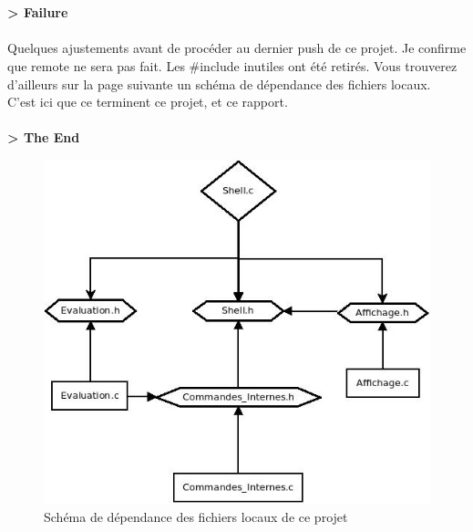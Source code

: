 \\\\
\textbf{> Failure}
\\\\
Quelques ajustements avant de procéder au dernier push de ce projet. Je confirme que remote ne sera pas fait. Les \#include inutiles ont été retirés. Vous trouverez d'ailleurs sur la page suivante un schéma de dépendance des fichiers locaux.
\\C'est ici que ce terminent ce projet, et ce rapport.
\\\\
\textbf{> The End}
\newpage
\begin{figure}[p]
\centering
\includegraphics[width=400pt]{Diagramme_dependances.jpg}
\caption{Schéma de dépendance des fichiers locaux de ce projet}
\end{figure}